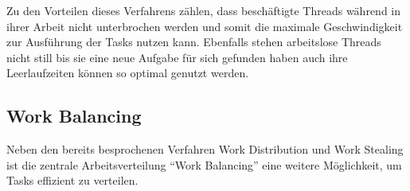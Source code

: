 Zu den Vorteilen dieses Verfahrens zählen, dass beschäftigte Threads während in ihrer Arbeit nicht unterbrochen werden und somit die maximale Geschwindigkeit zur Ausführung der Tasks nutzen kann. Ebenfalls stehen arbeitslose Threads nicht still bis sie eine neue Aufgabe für sich gefunden haben auch ihre Leerlaufzeiten können so optimal genutzt werden.


\subsection{Work Balancing}

Neben den bereits besprochenen Verfahren Work Distribution und Work Stealing ist die zentrale Arbeitsverteilung “Work Balancing” eine weitere Möglichkeit, um Tasks effizient zu verteilen. 